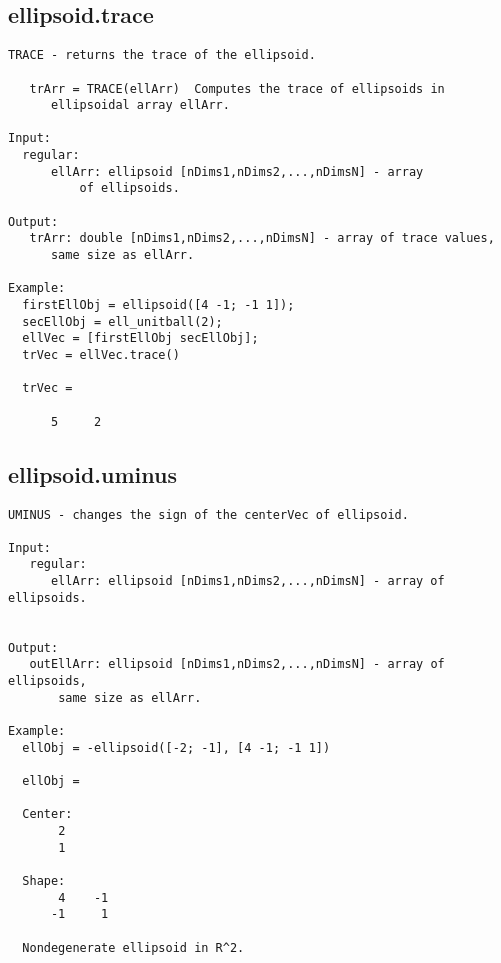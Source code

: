 \subsection{\texorpdfstring{ellipsoid.trace}{trace}}\label{method:ellipsoid.trace}
\begin{verbatim}
TRACE - returns the trace of the ellipsoid.

   trArr = TRACE(ellArr)  Computes the trace of ellipsoids in
      ellipsoidal array ellArr.

Input:
  regular:
      ellArr: ellipsoid [nDims1,nDims2,...,nDimsN] - array
          of ellipsoids.

Output:
   trArr: double [nDims1,nDims2,...,nDimsN] - array of trace values,
      same size as ellArr.

Example:
  firstEllObj = ellipsoid([4 -1; -1 1]);
  secEllObj = ell_unitball(2);
  ellVec = [firstEllObj secEllObj];
  trVec = ellVec.trace()

  trVec =

      5     2
\end{verbatim}
\subsection{\texorpdfstring{ellipsoid.uminus}{uminus}}\label{method:ellipsoid.uminus}
\begin{verbatim}
UMINUS - changes the sign of the centerVec of ellipsoid.

Input:
   regular:
      ellArr: ellipsoid [nDims1,nDims2,...,nDimsN] - array of ellipsoids.


Output:
   outEllArr: ellipsoid [nDims1,nDims2,...,nDimsN] - array of ellipsoids,
       same size as ellArr.

Example:
  ellObj = -ellipsoid([-2; -1], [4 -1; -1 1])

  ellObj =

  Center:
       2
       1

  Shape:
       4    -1
      -1     1

  Nondegenerate ellipsoid in R^2.
\end{verbatim}
